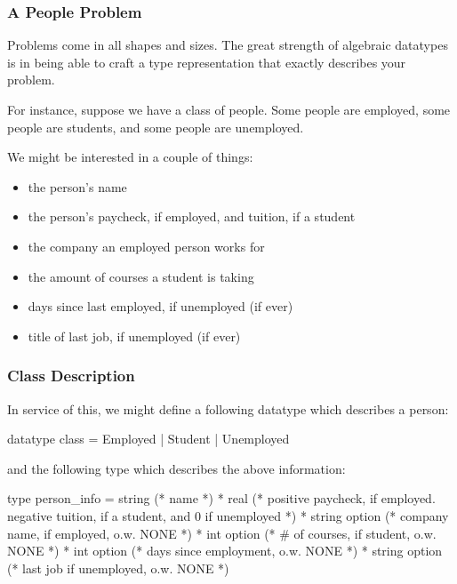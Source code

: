 \documentclass[aspectratio=169]{beamer}
\begin{document}

\begin{frame}[fragile]
  \frametitle{A People Problem}

  Problems come in all shapes and sizes. The great strength of algebraic datatypes
  is in being able to craft a type representation that exactly describes your problem.

  \pause
  \vspace{\fill}

  For instance, suppose we have a class of people. Some people are employed, some
  people are students, and some people are unemployed.  

  \pause
  \vspace{\fill}

  We might be interested in a couple of things:
  \begin{itemize}
    \item the person's name
    \item the person's paycheck, if employed, and tuition, if a student
    \item the company an employed person works for 
    \item the amount of courses a student is taking
    \item days since last employed, if unemployed (if ever)
    \item title of last job, if unemployed (if ever)
  \end{itemize}
\end{frame}

\begin{frame}[fragile]
  \frametitle{Class Description}

  In service of this, we might define a following datatype which describes a person:
  \begin{codeblock}
    datatype class = Employed | Student | Unemployed
  \end{codeblock}

  \pause
  and the following type which describes the above information:
  \begin{codeblock}
    type person_info =
      string (* name *)
      * real (* positive paycheck, if employed. negative 
                tuition, if a student, and 0 if unemployed *)
      * string option (* company name, if employed, o.w. NONE *)
      * int option    (* # of courses, if student, o.w. NONE *)
      * int option    (* days since employment, o.w. NONE *)
      * string option (* last job if unemployed, o.w. NONE *)
  \end{codeblock}
\end{frame}
\end{document}
